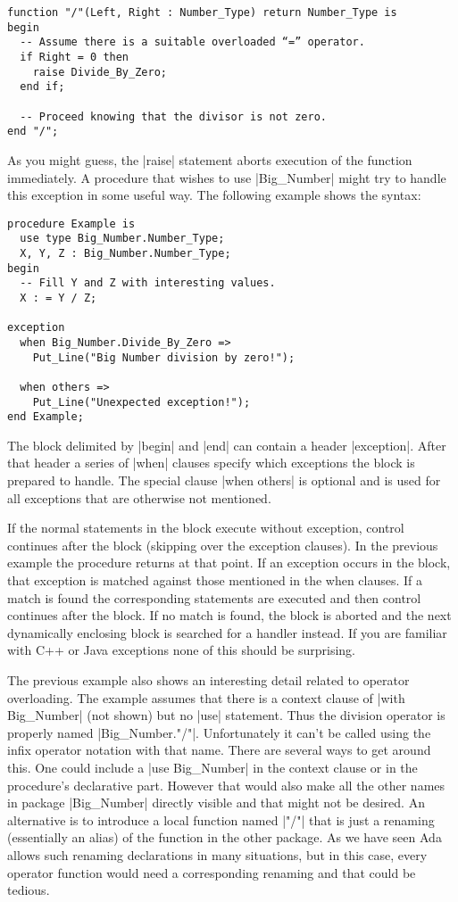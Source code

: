 \begin{lstlisting}
function "/"(Left, Right : Number_Type) return Number_Type is
begin
  -- Assume there is a suitable overloaded “=” operator.
  if Right = 0 then
    raise Divide_By_Zero;
  end if;

  -- Proceed knowing that the divisor is not zero.
end "/";
\end{lstlisting}

\noindent As you might guess, the |raise| statement aborts execution of the function
immediately. A procedure that wishes to use |Big_Number| might try to handle this exception in
some useful way. The following example shows the syntax:

\begin{lstlisting}
procedure Example is
  use type Big_Number.Number_Type;
  X, Y, Z : Big_Number.Number_Type;
begin
  -- Fill Y and Z with interesting values.
  X : = Y / Z;

exception
  when Big_Number.Divide_By_Zero =>
    Put_Line("Big Number division by zero!");

  when others =>
    Put_Line("Unexpected exception!");
end Example;
\end{lstlisting}

\noindent The block delimited by |begin| and |end| can contain a header |exception|. After that
header a series of |when| clauses specify which exceptions the block is prepared to handle. The
special clause |when others| is optional and is used for all exceptions that are otherwise not
mentioned.

If the normal statements in the block execute without exception, control continues after the
block (skipping over the exception clauses). In the previous example the procedure returns at
that point. If an exception occurs in the block, that exception is matched against those
mentioned in the when clauses. If a match is found the corresponding statements are executed and
then control continues after the block. If no match is found, the block is aborted and the next
dynamically enclosing block is searched for a handler instead. If you are familiar with C++ or
Java exceptions none of this should be surprising.

The previous example also shows an interesting detail related to operator overloading. The
example assumes that there is a context clause of |with Big_Number| (not shown) but no |use|
statement. Thus the division operator is properly named |Big_Number."/"|. Unfortunately it can't
be called using the infix operator notation with that name. There are several ways to get around
this. One could include a |use Big_Number| in the context clause or in the procedure's
declarative part. However that would also make all the other names in package |Big_Number|
directly visible and that might not be desired. An alternative is to introduce a local function
named |"/"| that is just a renaming (essentially an alias) of the function in the other package.
As we have seen Ada allows such renaming declarations in many situations, but in this case,
every operator function would need a corresponding renaming and that could be tedious.

